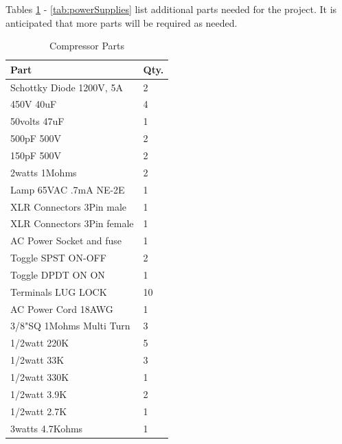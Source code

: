 \documentclass[journal]{IEEEtran}
\begin{document}
	
	
	\appendix
	Tables \ref{tab:compressorParts} - \ref{tab:powerSupplies} list additional parts needed for the project. It is anticipated that more parts will be required as needed.
	
	
	
	\begin{table}[]
		\centering
		\caption{Compressor Parts}
		\label{tab:compressorParts}
		\begin{tabular}{l|l}
			Part                           & Qty. \\\hline
			Schottky Diode 1200V, 5A              & 2          \\
			450V 40uF                             & 4          \\
			50volts 47uF                          & 1          \\
			500pF 500V                            & 2          \\
			150pF 500V                            & 2          \\
			2watts 1Mohms                         & 2          \\
			Lamp 65VAC .7mA NE-2E                 & 1          \\
			XLR Connectors 3Pin male                & 1          \\
			XLR Connectors 3Pin female              & 1          \\
			AC Power Socket and fuse              & 1          \\
			Toggle SPST ON-OFF                    & 2          \\
			Toggle DPDT ON ON                     & 1          \\
			Terminals LUG LOCK                    & 10         \\
			AC Power Cord 18AWG                   & 1          \\
			3/8"SQ 1Mohms Multi Turn              & 3          \\
			1/2watt 220K                          & 5          \\
			1/2watt 33K                           & 3          \\
			1/2watt 330K                          & 1          \\
			1/2watt 3.9K                          & 2          \\
			1/2watt 2.7K                          & 1          \\
			3watts 4.7Kohms                       & 1          \\

\end{tabular}
\end{table}
\end{document}
